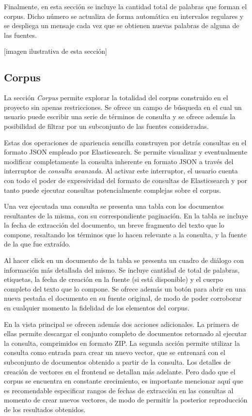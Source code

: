 Finalmente, en esta sección se incluye la cantidad total de palabras que forman el corpus. Dicho número se
actualiza de forma automática en intervalos regulares y se despliega un mensaje cada vez que se obtienen
nuevas palabras de alguna de las fuentes.

[imagen ilustrativa de esta sección]

\subsection{Corpus}

La sección \textit{Corpus} permite explorar la totalidad del corpus construido en el proyecto sin apenas
restricciones. Se ofrece un campo de búsqueda en el cual un usuario puede escribir una serie de términos
de consulta y se ofrece además la posibilidad de filtrar por un subconjunto de las fuentes consideradas.

Estas dos operaciones de apariencia sencilla construyen por detrás consultas en el formato JSON empleado
por Elasticsearch. Se permite visualizar y eventualmente modificar completamente la consulta inherente en
formato JSON a través del interruptor de \textit{consulta avanzada}. Al activar este interruptor, el
usuario cuenta con todo el poder de expresividad del formato de consultas de Elasticsearch y por tanto
puede ejecutar consultas potencialmente complejas sobre el corpus.

Una vez ejecutada una consulta se presenta una tabla con los documentos resultantes de la misma, con su
correspondiente paginación. En la tabla se incluye la fecha de extracción del documento, un breve fragmento
del texto que lo compone, resaltando los términos que lo hacen relevante a la consulta, y la fuente de la
que fue extraído.

Al hacer click en un documento de la tabla se presenta un cuadro de diálogo con información más detallada
del mismo. Se incluye cantidad de total de palabras, etiquetas, la fecha de creación en la fuente (si está
disponible) y el cuerpo completo del texto que lo compone. Se ofrece además un botón para abrir en una
nueva pestaña el documento en su fuente original, de modo de poder corroborar en cualquier momento la
fidelidad de los elementos del corpus.

En la vista principal se ofrecen además dos acciones adicionales. La primera de ellas permite descargar el
conjunto completo de documentos retornado al ejecutar la consulta, comprimidos en formato ZIP. La segunda
acción permite utilizar la consulta como entrada para crear un nuevo vector, que se entrenará con el
subconjunto de documentos obtenido a partir de la consulta. Los detalles de creación de vectores en el
frontend se detallan más adelante. Pero dado que el corpus se encuentra en constante crecimiento, es
importante mencionar aquí que es recomendable especificar rangos de fechas de extracción en las consultas
al momento de crear nuevos vectores, de modo de permitir la posterior reproducción de los resultados
obtenidos.

